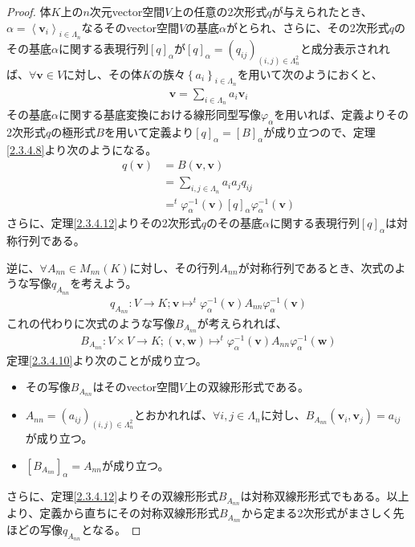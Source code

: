\documentclass[dvipdfmx]{jsarticle}
\begin{document}
\begin{proof}
体$K$上の$n$次元vector空間$V$上の任意の2次形式$q$が与えられたとき、$\alpha = \left\langle \mathbf{v}_{i} \right\rangle_{i \in \varLambda_{n}}$なるそのvector空間$V$の基底$\alpha$がとられ、さらに、その2次形式$q$のその基底$\alpha$に関する表現行列$[ q]_{\alpha}$が$[ q]_{\alpha} = \left( q_{ij} \right)_{(i,j) \in \varLambda_{n}^{2}}$と成分表示されれば、$\forall\mathbf{v} \in V$に対し、その体$K$の族々$\left\{ a_{i} \right\}_{i \in \varLambda_{n}}$を用いて次のようにおくと、
\begin{align*}
\mathbf{v} = \sum_{i \in \varLambda_{n}} {a_{i}\mathbf{v}_{i}}
\end{align*}
その基底$\alpha$に関する基底変換における線形同型写像$\varphi_{\alpha}$を用いれば、定義よりその2次形式$q$の極形式$B$を用いて定義より$[ q]_{\alpha} = [ B]_{\alpha}$が成り立つので、定理\ref{2.3.4.8}より次のようになる。
\begin{align*}
q\left( \mathbf{v} \right) &= B\left( \mathbf{v},\mathbf{v} \right)\\
&= \sum_{i,j \in \varLambda_{n}} {a_{i}a_{j}q_{ij}}\\
&=^{t}\varphi_{\alpha}^{- 1}\left( \mathbf{v} \right)[ q]_{\alpha}\varphi_{\alpha}^{- 1}\left( \mathbf{v} \right)
\end{align*}
さらに、定理\ref{2.3.4.12}よりその2次形式$q$のその基底$\alpha$に関する表現行列$[ q]_{\alpha}$は対称行列である。\par
逆に、$\forall A_{nn} \in M_{nn}(K)$に対し、その行列$A_{nn}$が対称行列であるとき、次式のような写像$q_{A_{nn}}$を考えよう。
\begin{align*}
q_{A_{nn}}:V \rightarrow K;\mathbf{v} \mapsto^{t}\varphi_{\alpha}^{- 1}\left( \mathbf{v} \right)A_{nn}\varphi_{\alpha}^{- 1}\left( \mathbf{v} \right)
\end{align*}
これの代わりに次式のような写像$B_{A_{nn}}$が考えられれば、
\begin{align*}
B_{A_{nn}}:V \times V \rightarrow K;\left( \mathbf{v},\mathbf{w} \right) \mapsto^{t}\varphi_{\alpha}^{- 1}\left( \mathbf{v} \right)A_{nn}\varphi_{\alpha}^{- 1}\left( \mathbf{w} \right)
\end{align*}
定理\ref{2.3.4.10}より次のことが成り立つ。
\begin{itemize}
\item
  その写像$B_{A_{nn}}$はそのvector空間$V$上の双線形形式である。
\item
  $A_{nn} = \left( a_{ij} \right)_{(i,j) \in \varLambda_{n}^{2}}$とおかれれば、$\forall i,j \in \varLambda_{n}$に対し、$B_{A_{nn}}\left( \mathbf{v}_{i},\mathbf{v}_{j} \right) = a_{ij}$が成り立つ。
\item
  $\left[ B_{A_{nn}} \right]_{\alpha} = A_{nn}$が成り立つ。
\end{itemize}
さらに、定理\ref{2.3.4.12}よりその双線形形式$B_{A_{nn}}$は対称双線形形式でもある。以上より、定義から直ちにその対称双線形形式$B_{A_{nn}}$から定まる2次形式がまさしく先ほどの写像$q_{A_{nn}}$となる。
\end{proof}
\end{document}
